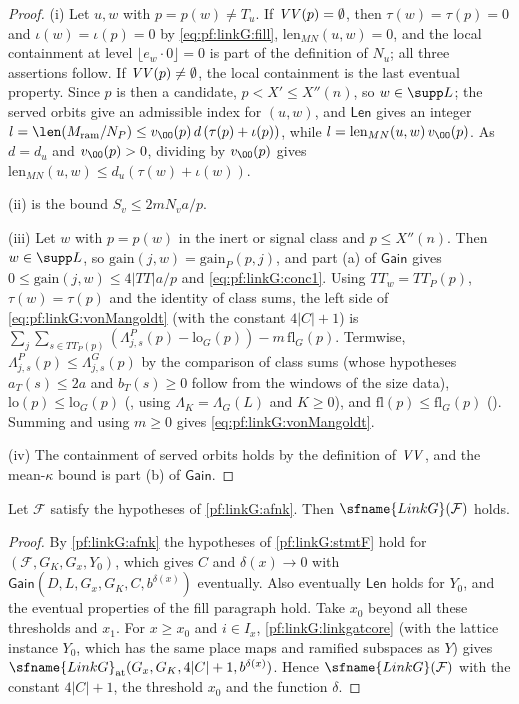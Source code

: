 \begin{proof}
(i) Let $u,w$ with $p=p(w)\ne T_u$. If $\mathit{VV}(p)=\emptyset$, then $\tau(w)=\tau(p)=0$ and $\iota(w)=\iota(p)=0$ by
\eqref{eq:pf:linkG:fill}, $\mathrm{len}_{MN}(u,w)=0$, and the local containment at level $\lfloor e_w\cdot0\rfloor=0$ is
part of the definition of $N_u$; all three assertions follow. If $\mathit{VV}(p)\ne\emptyset$, the local containment is the last eventual
property. Since $p$ is then a candidate, $p<X'\le X''(n)$, so $w\in\supp L$; the served orbits give an admissible index
for $(u,w)$, and $\mathsf{Len}$ gives an integer $l=\len(M_{\mathrm{ram}}/N_P)\le
v_\OO(p)\,d\,(\tau(p)+\iota(p))$, while $l=\mathrm{len}_{MN}(u,w)\,v_\OO(p)$. As $d=d_u$ and $v_\OO(p)>0$, dividing by
$v_\OO(p)$ gives $\mathrm{len}_{MN}(u,w)\le d_u(\tau(w)+\iota(w))$.

(ii) is the bound $S_v\le2mN_va/p$.

(iii) Let $w$ with $p=p(w)$ in the inert or signal class and $p\le X''(n)$. Then $w\in\supp L$, so
$\mathrm{gain}(j,w)=\mathrm{gain}_P(p,j)$, and part (a) of $\mathsf{Gain}$ gives $0\le\mathrm{gain}(j,w)\le4|TT|a/p$
and \eqref{eq:pf:linkG:conc1}. Using $TT_w=TT_P(p)$, $\tau(w)=\tau(p)$ and the identity of class sums, the left side of
\eqref{eq:pf:linkG:vonMangoldt} (with the constant $4|C|+1$) is
$\sum_j\sum_{s\in TT_P(p)}(\Lambda^P_{j,s}(p)-\mathrm{lo}_G(p))-m\,\mathrm{fl}_G(p)$. Termwise,
$\Lambda^P_{j,s}(p)\le\Lambda^G_{j,s}(p)$ by the comparison of class sums (whose hypotheses $a_T(s)\le2a$ and $b_T(s)\ge0$
follow from the windows of the size data), $\mathrm{lo}(p)\le\mathrm{lo}_G(p)$
(, using $\Lambda_K=\Lambda_G(L)$ and $K\ge0$), and $\mathrm{fl}(p)\le
\mathrm{fl}_G(p)$ (). Summing and using $m\ge0$ gives
\eqref{eq:pf:linkG:vonMangoldt}.

(iv) The containment of served orbits holds by the definition of $\mathit{VV}$, and the mean-$\kappa$ bound is part (b) of
$\mathsf{Gain}$.
\end{proof}

\begin{theorem}\label{pf:linkG:withoutkernels}
Let $\mathcal F$ satisfy the hypotheses of \cref{pf:linkG:afnk}. Then $\sfname{LinkG}(\mathcal F)$ holds.
\end{theorem}

\begin{proof}
By \cref{pf:linkG:afnk} the hypotheses of \cref{pf:linkG:stmtF} hold for $(\mathcal F,G_K,G_x,Y_0)$, which gives $C$
and $\delta(x)\to0$ with $\mathsf{Gain}(D,L,G_x,G_K,C,b^{\delta(x)})$ eventually. Also eventually $\mathsf{Len}$
holds for $Y_0$, and the eventual properties of the fill paragraph hold. Take $x_0$ beyond all these thresholds and
$x_1$. For $x\ge x_0$ and $i\in I_x$, \cref{pf:linkG:linkgatcore} (with the lattice instance $Y_0$, which has the
same place maps and ramified subspaces as $Y$) gives $\sfname{LinkG}_{\mathrm{at}}(G_x,G_K,4|C|+1,b^{\delta(x)})$. Hence
$\sfname{LinkG}(\mathcal F)$ with the constant $4|C|+1$, the threshold $x_0$ and the function $\delta$.
\end{proof}

